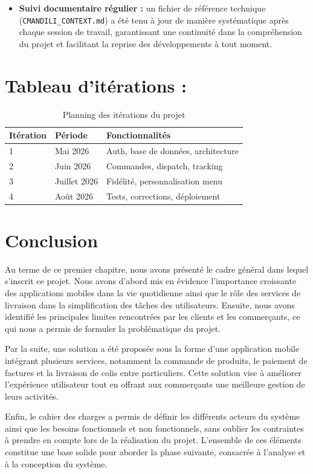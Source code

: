 \documentclass[12pt,fleqn,a4paper]{report}
\begin{document}
\begin{justify}
\begin{itemize}
    \item \textbf{Suivi documentaire régulier :} un fichier de référence technique
    (\texttt{CMANDILI\_CONTEXT.md}) a été tenu à jour de manière systématique après
    chaque session de travail, garantissant une continuité dans la compréhension du
    projet et facilitant la reprise des développements à tout moment.
\end{itemize}



\newpage
\section{Tableau d'itérations : }
\begin{table}[H]
\centering
\begin{tabular}{|l|l|l|}
\hline
\textbf{Itération} & \textbf{Période} & \textbf{Fonctionnalités} \\
\hline
1 & Mai 2026 & Auth, base de données, architecture \\
2 & Juin 2026 & Commandes, dispatch, tracking \\
3 & Juillet 2026 & Fidélité, personnalisation menu \\
4 & Août 2026 & Tests, corrections, déploiement \\
\hline
\end{tabular}
\caption{Planning des itérations du projet}
\end{table}
\section{Conclusion}
Au terme de ce premier chapitre, nous avons présenté le cadre général dans lequel s'inscrit ce projet. Nous avons d'abord mis en évidence l'importance croissante des applications mobiles dans la vie quotidienne ainsi que le rôle des services de livraison dans la simplification des tâches des utilisateurs. Ensuite, nous avons identifié les principales limites rencontrées par les clients et les commerçants, ce qui nous a permis de formuler la problématique du projet.

Par la suite, une solution a été proposée sous la forme d'une application mobile intégrant plusieurs services, notamment la commande de produits, le paiement de factures et la livraison de colis entre particuliers. Cette solution vise à améliorer l'expérience utilisateur tout en offrant aux commerçants une meilleure gestion de leurs activités.

Enfin, le cahier des charges a permis de définir les différents acteurs du système ainsi que les besoins fonctionnels et non fonctionnels, sans oublier les contraintes à prendre en compte lors de la réalisation du projet. L'ensemble de ces éléments constitue une base solide pour aborder la phase suivante, consacrée à l'analyse et à la conception du système.



\end{justify}
\end{document}
